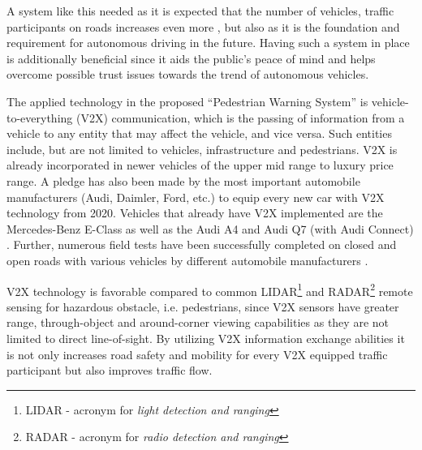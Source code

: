 A system like this needed as it is expected that the number of vehicles, traffic participants on roads increases even more \cite{}, but also as it is the foundation and requirement for autonomous driving in the future.  Having such a system in place is additionally beneficial since it aids the public's peace of mind and helps overcome possible trust issues towards the trend of autonomous vehicles.

The applied technology in the proposed ``Pedestrian Warning System'' is vehicle-to-everything (V2X) communication, which is the passing of information from a vehicle to any entity that may affect the vehicle, and vice versa. Such entities include, but are not limited to vehicles, infrastructure and pedestrians. V2X is already incorporated in newer vehicles of the upper mid range to luxury price range.
A pledge has also been made by the most important automobile manufacturers (Audi, Daimler, Ford, etc.)
to equip every new car with V2X technology from 2020.
Vehicles that already have V2X implemented are the 
Mercedes-Benz E-Class
as well as the Audi A4 and Audi Q7 (with Audi Connect) \cite{}.
Further, numerous field tests have been successfully completed on closed and open roads with various vehicles by different automobile manufacturers \cite{}.

V2X technology is favorable compared to common LIDAR\footnote{LIDAR - acronym for \textit{light detection and ranging}} and RADAR\footnote{RADAR - acronym for \textit{radio detection and ranging}} remote sensing for hazardous obstacle, i.e. pedestrians, since V2X sensors have greater range, through-object and around-corner viewing capabilities as they are not limited to direct line-of-sight.
By utilizing V2X information exchange abilities it is not only increases road safety and mobility for every V2X equipped traffic participant but also improves traffic flow.

